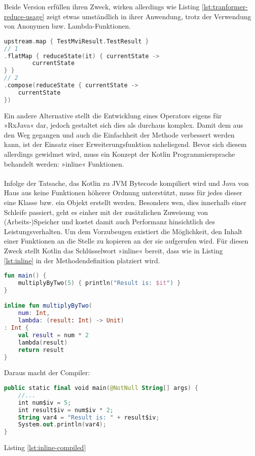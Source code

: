 Beide Version erfüllen ihren Zweck, wirken allerdings wie Listing 
\ref{lst:tranformer-reduce-usage}
zeigt etwas umständlich in ihrer Anwendung, trotz der Verwendung von Anonymen bzw. Lambda-Funktionen.
\begin{lstlisting}[caption={2. Versuch}, label={tranformer-reduce-usage},language=Kotlin]
upstream.map { TestMviResult.TestResult }
// 1
.flatMap { reduceState(it) { currentState ->
		currentState
} }
// 2
.compose(reduceState { currentState ->
	currentState
})
\end{lstlisting}
\bigskip
Ein andere Alternative stellt die Entwicklung eines Operators eigens für »RxJava« dar, jedoch gestaltet sich dies als durchaus komplex.
\cite{rxjavaCustomOperator}
Damit dem aus den Weg gegangen und auch die Einfachheit der Methode verbessert werden kann, ist der Einsatz einer Erweiterungsfunktion naheliegend. Bevor sich diesem allerdings gewidmet wird, muss ein Konzept der Kotlin Programmiersprache behandelt werden: »inline« Funktionen.
\\\\
Infolge der Tatsache, das Kotlin zu JVM Bytecode kompiliert wird und Java von Haus aus keine Funktionen höherer Ordnung unterstützt, muss für jedes dieser eine Klasse bzw. ein Objekt erstellt werden. Besonders wen, dies innerhalb einer Schleife passiert, geht es einher mit der zusätzlichen Zuweisung von (Arbeits-)Speicher und kostet damit auch Performanz hinsichtlich des Leistungsverhalten. Um dem Vorzubeugen existiert die Möglichkeit, den Inhalt einer Funktionen an die Stelle zu kopieren an der sie aufgerufen wird. Für diesen Zweck stellt Kotlin das Schlüsselwort »inline« bereit, dass wie in Listing 
\ref{lst:inline}
in der Methodendefinition platziert wird.
\begin{lstlisting}[caption={inline}, label={lst:inline},language=Kotlin]
fun main() {
	multiplyByTwo(5) { println("Result is: $it") }
}

inline fun multiplyByTwo(
	num: Int, 
	lambda: (result: Int) -> Unit)
: Int {
	val result = num * 2
	lambda(result)
	return result
}
\end{lstlisting}
\bigskip
Daraus macht der Compiler:
\begin{lstlisting}[caption={inline kompiliert}, label={lst:inline-compiled},language=Kotlin]
public static final void main(@NotNull String[] args) {
	//...
	int num$iv = 5;
	int result$iv = num$iv * 2;
	String var4 = "Result is: " + result$iv;
	System.out.println(var4);
}
\end{lstlisting}
\bigskip
Listing
\ref{lst:inline-compiled}
